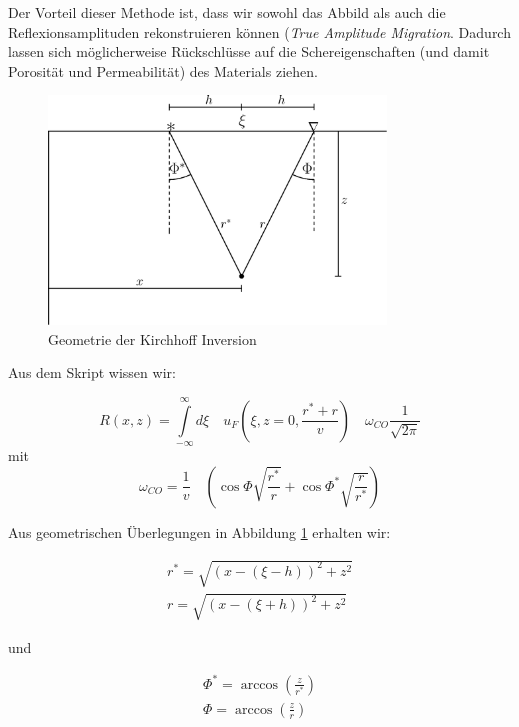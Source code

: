 \documentclass[12pt,a4paper]{scrartcl}
\begin{document}
Der Vorteil dieser Methode ist, dass wir sowohl das Abbild als auch die Reflexionsamplituden rekonstruieren können (\textit{True Amplitude Migration}. Dadurch lassen sich möglicherweise Rückschlüsse auf die Schereigenschaften (und damit Porosität und Permeabilität) des Materials ziehen.


\begin{figure}[htb]
\centering
\includegraphics[width=0.8\textwidth]{kirchhoffgeometrie}
\caption{Geometrie der Kirchhoff Inversion}
\label{kirchhoffgeometrie}
\end{figure}


Aus dem Skript wissen wir:

\begin{equation}
	R(x,z) = \int\limits_{-\infty}^{\infty} 
		d\xi \quad u_F(\xi,z=0,\frac{r^*+r }{v})
		\quad \omega_{CO} \frac{1}{\sqrt{2 \pi}}
\end{equation}
mit
\begin{equation}
	\omega_{CO} = \frac{1}{v} \quad ( \cos \Phi \sqrt{\frac{r^*}{r}} + 
		\cos \Phi^* \sqrt{\frac{r}{r^*}})
\end{equation}




Aus geometrischen Überlegungen in Abbildung \ref{kirchhoffgeometrie} erhalten wir:

\begin{eqnarray}
	r^* = \sqrt{ (x-(\xi - h))^2 + z^2 }  \\
	r = \sqrt{ (x-(\xi + h))^2 + z^2 }
\end{eqnarray}

und

\begin{eqnarray}
	\Phi^* = \arccos( \frac{z}{r^*} )	\\
	\Phi = \arccos ( \frac{z}{r} )
\end{eqnarray}
\end{document}

